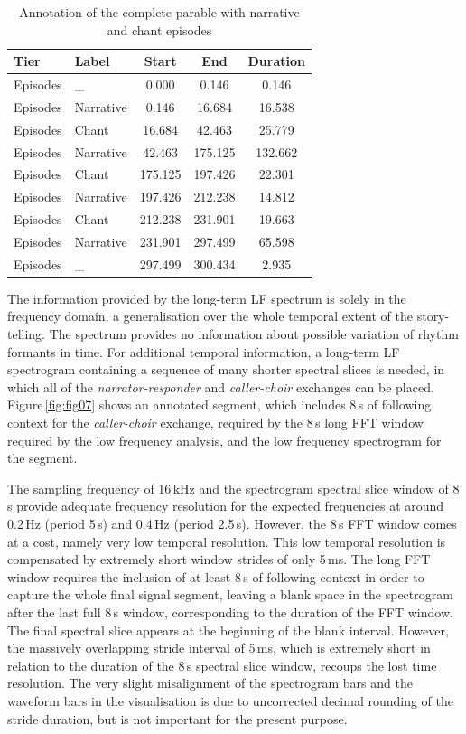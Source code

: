 \documentclass[output=paper,colorlinks,citecolor=brown
]{langscibook}
\begin{document}
\begin{table}[ht]
\centering
\caption{Annotation of the complete parable with narrative and chant episodes}
\vspace{0.2cm}
\label{table:table02}
\begin{tabular}{|l||l||c|c||c|}
\hline
\textbf{Tier} & \textbf{Label} & \textbf{Start} & \textbf{End} & \textbf{Duration}\\
\hline\hline
Episodes	&	\_	&	0.000	&	0.146	&	0.146\\
Episodes	&	Narrative	&	0.146	&	16.684	&	16.538\\
Episodes	&	Chant	&	16.684	&	42.463	&	25.779\\
Episodes	&	Narrative	&	42.463	&	175.125	&	132.662\\
Episodes	&	Chant	&	175.125	&	197.426	&	22.301\\
Episodes	&	Narrative	&	197.426	&	212.238	&	14.812\\
Episodes	&	Chant	&	212.238	&	231.901	&	19.663\\
Episodes	&	Narrative	&	231.901	&	297.499	&	65.598\\
Episodes	&	\_	&	297.499	&	300.434	&	2.935\\
\hline
\end{tabular}
\end{table}
\noindent
The information provided by the long-term LF spectrum is solely in the frequency domain, a generalisation over the whole temporal extent of the story-telling. The spectrum provides no information about possible variation of rhythm formants in time. For additional temporal information, a long-term LF spectrogram containing a sequence of many shorter spectral slices is needed, in which all of the \textit{narrator-responder} and \textit{caller-choir} exchanges can be placed. Figure\,\ref{fig:fig07} shows an annotated segment, which includes 8\,s of following context for the \textit{caller-choir} exchange, required by the 8\,s long FFT window required by the low frequency analysis, and the low frequency spectrogram for the segment.

The sampling frequency of 16\,kHz and the spectrogram spectral slice window of 8\,s provide adequate frequency resolution for the expected frequencies at around 0.2\,Hz (period 5\,s) and 0.4\,Hz (period 2.5\,s). However, the 8\,s FFT window comes at a cost, namely very low temporal resolution. This low temporal resolution is compensated by extremely short window strides of only 5\,ms. The long FFT window requires the inclusion of at least 8\,s of following context in order to capture the whole final signal segment, leaving a blank space in the spectrogram after the last full 8\,s window, corresponding to the duration of the FFT window. The final spectral slice appears at the beginning of the blank interval. However, the massively overlapping stride interval of 5\,ms, which is extremely short in relation to the duration of the 8\,s spectral slice window, recoups the lost time resolution. The very slight misalignment of the spectrogram bars and the waveform bars in the visualisation is due to uncorrected decimal rounding of the stride duration, but is not important for the present purpose.
\end{document}

